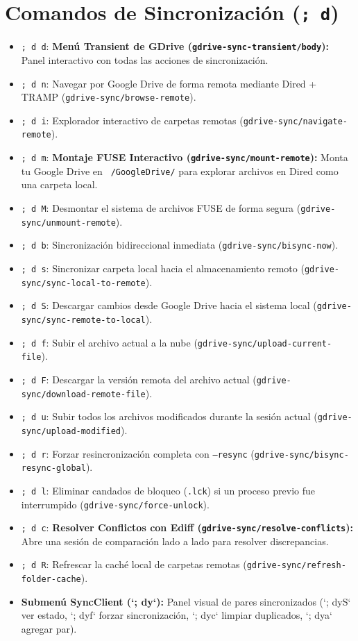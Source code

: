 \documentclass[11pt,book,spanish,alphabetic]{apuntes-scr}
\begin{document}
\section{Comandos de Sincronización (\texttt{; d})}
\begin{itemize}[leftmargin=8mm]
    \item \texttt{; d d}: \textbf{Menú Transient de GDrive (\texttt{gdrive-sync-transient/body}):} Panel interactivo con todas las acciones de sincronización.
    \item \texttt{; d n}: Navegar por Google Drive de forma remota mediante Dired + TRAMP (\texttt{gdrive-sync/browse-remote}).
    \item \texttt{; d i}: Explorador interactivo de carpetas remotas (\texttt{gdrive-sync/navigate-remote}).
    \item \texttt{; d m}: \textbf{Montaje FUSE Interactivo (\texttt{gdrive-sync/mount-remote}):} Monta tu Google Drive en \texttt{\string~/GoogleDrive/} para explorar archivos en Dired como una carpeta local.
    \item \texttt{; d M}: Desmontar el sistema de archivos FUSE de forma segura (\texttt{gdrive-sync/unmount-remote}).
    \item \texttt{; d b}: Sincronización bidireccional inmediata (\texttt{gdrive-sync/bisync-now}).
    \item \texttt{; d s}: Sincronizar carpeta local hacia el almacenamiento remoto (\texttt{gdrive-sync/sync-local-to-remote}).
    \item \texttt{; d S}: Descargar cambios desde Google Drive hacia el sistema local (\texttt{gdrive-sync/sync-remote-to-local}).
    \item \texttt{; d f}: Subir el archivo actual a la nube (\texttt{gdrive-sync/upload-current-file}).
    \item \texttt{; d F}: Descargar la versión remota del archivo actual (\texttt{gdrive-sync/download-remote-file}).
    \item \texttt{; d u}: Subir todos los archivos modificados durante la sesión actual (\texttt{gdrive-sync/upload-modified}).
    \item \texttt{; d r}: Forzar resincronización completa con \texttt{--resync} (\texttt{gdrive-sync/bisync-resync-global}).
    \item \texttt{; d l}: Eliminar candados de bloqueo (\texttt{.lck}) si un proceso previo fue interrumpido (\texttt{gdrive-sync/force-unlock}).
    \item \texttt{; d c}: \textbf{Resolver Conflictos con Ediff (\texttt{gdrive-sync/resolve-conflicts}):} Abre una sesión de comparación lado a lado para resolver discrepancias.
    \item \texttt{; d R}: Refrescar la caché local de carpetas remotas (\texttt{gdrive-sync/refresh-folder-cache}).
    \item \textbf{Submenú SyncClient (`; dy`):} Panel visual de pares sincronizados (`; dyS` ver estado, `; dyf` forzar sincronización, `; dyc` limpiar duplicados, `; dya` agregar par).
\end{itemize}
\end{document}
